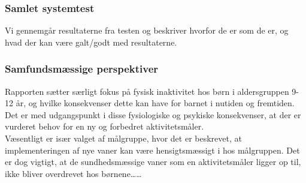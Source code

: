 \subsubsection{Samlet systemtest}
Vi gennemgår resultaterne fra testen og beskriver hvorfor de er som de er, og hvad der kan være galt/godt med resultaterne.


\subsubsection{Samfundsmæssige perspektiver}
Rapporten sætter særligt fokus på fysisk inaktivitet hos børn i aldersgruppen 9-12 år, og hvilke konsekvenser dette kan have for barnet i nutiden og fremtiden. Det er med udgangspunkt i disse fysiologiske og psykiske konsekvenser, at der er vurderet behov for en ny og forbedret aktivitetsmåler. \\
Væsentligt er især valget af målgruppe, hvor det er beskrevet, at implementeringen af nye vaner kan være hensigtsmæssigt i hos målgruppen. Det er dog vigtigt, at de sundhedsmæssige vaner som en aktivitetsmåler ligger op til, ikke bliver overdrevet hos børnene……
